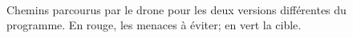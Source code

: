 \documentclass[12pt]{article}
\begin{document}
\begin{figure}[p]
  \centering

  \mbox{
  }

  \caption{Chemins parcourus par le drone pour les deux versions
    différentes du programme. En rouge, les menaces à éviter; en vert
    la cible.}
  \label{paths}
\end{figure}



\end{document}
